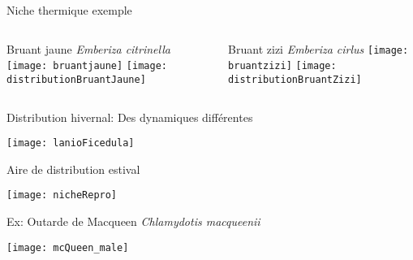 \documentclass[]{beamer}
\begin{document}
\begin{frame}{Niche thermique exemple}
  \begin{columns}[c]
    \begin{column}[c]{0.5\textwidth}
      \begin{center}
       Bruant jaune \textit{Emberiza citrinella}
        \vspace{10pt}
        \texttt{[image: bruantjaune]}
          \vspace{5pt}
          \texttt{[image: distributionBruantJaune]}   
      \end{center}
    \end{column}
    \begin{column}[c]{0.5\textwidth}
   
     \begin{center}
       Bruant zizi \textit{Emberiza cirlus}
        \vspace{10pt}
        \texttt{[image: bruantzizi]}
          \vspace{5pt}
          \texttt{[image: distributionBruantZizi]}   
      \end{center}
     \end{column}
  \end{columns}
\end{frame}

\begin{frame}{Distribution hivernal: Des dynamiques différentes}
  \begin{center}
   \texttt{[image: lanioFicedula]}
  \end{center}
\end{frame}

\begin{frame}{Aire de distribution estival}
  \begin{center}
   \texttt{[image: nicheRepro]}
  \end{center}
\end{frame}


 \begin{frame}{Ex: Outarde de Macqueen \textit{Chlamydotis macqueenii}}
   \begin{center}
    \texttt{[image: mcQueen\_male]}
   \end{center}
 \end{frame}
 
\end{document}
